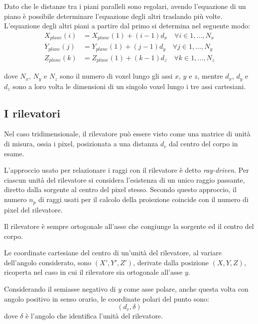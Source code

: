 \documentclass[12pt,a4paper]{report}
\begin{document}
Dato che le distanze tra i piani paralleli sono regolari, avendo l'equazione di un piano è possibile determinare l'equazione degli
altri traslando più volte.
L'equazione degli altri piani a partire dal primo si determina nel seguente modo:
\begin{align*}
  X_{plane}(i) &= X_{plane}(1) + (i - 1) d_x \quad \forall i \in 1, \dots, N_x \\
  Y_{plane}(j) &= Y_{plane}(1) + (j - 1) d_y \quad \forall j \in 1, \dots, N_y \\
  Z_{plane}(k) &= Z_{plane}(1) + (k - 1) d_z \quad \forall k \in 1, \dots, N_z
\end{align*}

dove \(N_x\), \(N_y\) e \(N_z\) sono il numero di voxel lungo gli assi \(x\), \(y\) e \(z\), mentre \(d_x\), \(d_y\) e \(d_z\)
sono a loro volta le dimensioni di un singolo voxel lungo i tre assi cartesiani.

\subsection{I rilevatori}

Nel caso tridimensionale, il rilevatore può essere visto come una matrice di unità di misura, ossia i pixel, posizionata a una
distanza \(d_r\) dal centro del corpo in esame.

L'approccio usato per relazionare i raggi con il rilevatore è detto \textit{ray-driven}.
Per ciascun unità del rilevatore si considera l'esistenza di un unico raggio passante, diretto dalla sorgente al centro del
pixel stesso.
Secondo questo approccio, il numero \(n_p\) di raggi usati per il calcolo della proiezione coincide con il numero di pixel del
rilevatore.

Il rilevatore è sempre ortogonale all'asse che congiunge la sorgente ed il centro del corpo.

Le coordinate cartesiane del centro di un'unità del rilevatore, al variare dell'angolo considerato, sono \((X', Y', Z')\),
derivate dalla posizione \((X, Y, Z)\), ricoperta nel caso in cui il rilevatore sia ortogonale all'asse \(y\).

Considerando il semiasse negativo di \(y\) come asse polare, anche questa volta con angolo positivo in senso orario, le
coordinate polari del punto sono:
\begin{equation*} %
  (d_r, \delta)
\end{equation*}
dove \(\delta\) è l'angolo che identifica l'unità del rilevatore.
\end{document}
